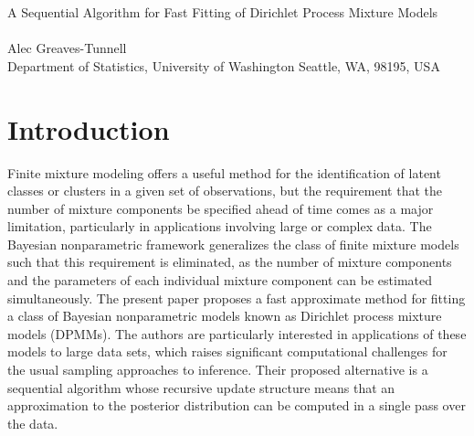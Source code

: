 \documentclass{uwstat572}
\begin{document}

\begin{center}
  {\LARGE A Sequential Algorithm for Fast Fitting of Dirichlet Process Mixture Models}\\\ \\
  {Alec Greaves-Tunnell \\ 
    Department of Statistics, University of Washington Seattle, WA, 98195, USA
  }
\end{center}



\begin{abstract}
  This paper discusses the motivation, implementation, and analysis of a sequential algorithm for approximate Bayesian inference in Dirichlet process mixture models introduced by \citet{zhang}. Bayesian Dirichlet process mixture models are a popular tool for clustering due to their flexibility, but standard sampling methods for approximating the posterior distribution do not scale well to large data sets. As data continues to grow in many applications, there is increasing interest in computationally efficient methods for fast approximation of the posterior. The authors propose one such method, V-SUGS, which extends a simple sequential algorithm known as SUGS (``sequential update and greedy search") by improving the representation of uncertainty over cluster assignments in the posterior. Comparative analysis of the two algorithms shows that V-SUGS performs better on data whose clusterings are close or overlapping while preserving the attractive computational structure of the original algorithm. Further experiments demonstrate the speed and relative accuracy with which the model can be fit to two large biological data sets.
\end{abstract}

\section{Introduction}

Finite mixture modeling offers a useful method for the identification of latent classes or clusters in a given set of observations, but the requirement that the number of mixture components be specified ahead of time comes as a major limitation, particularly in applications involving large or complex data. The Bayesian nonparametric framework generalizes the class of finite mixture models such that this requirement is eliminated, as the number of mixture components and the parameters of each individual mixture component can be estimated simultaneously. The present paper \citep{zhang} proposes a fast approximate method for fitting a class of Bayesian nonparametric models known as Dirichlet process mixture models (DPMMs). The authors are particularly interested in applications of these models to large data sets, which raises significant computational challenges for the usual sampling approaches to inference. Their proposed alternative is a sequential algorithm whose recursive update structure means that an approximation to the posterior distribution can be computed in a single pass over the data.
\end{document}
